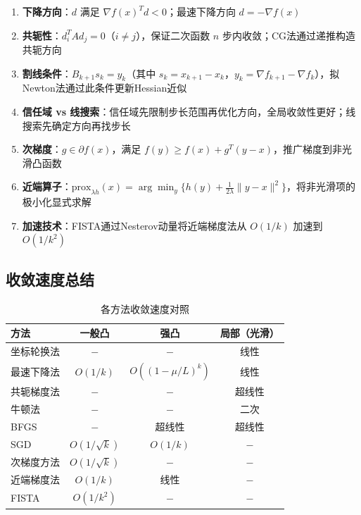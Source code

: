 \begin{enumerate}[label=\arabic*., leftmargin=2em]
    \item \textbf{下降方向}：$d$ 满足 $\nabla f(x)^T d < 0$；最速下降方向 $d = -\nabla f(x)$
    
    \item \textbf{共轭性}：$d_i^T A d_j = 0$（$i \neq j$），保证二次函数 $n$ 步内收敛；CG法通过递推构造共轭方向
    
    \item \textbf{割线条件}：$B_{k+1} s_k = y_k$（其中 $s_k = x_{k+1}-x_k$，$y_k = \nabla f_{k+1}-\nabla f_k$），拟Newton法通过此条件更新Hessian近似
    
    \item \textbf{信任域 vs 线搜索}：信任域先限制步长范围再优化方向，全局收敛性更好；线搜索先确定方向再找步长
    
    \item \textbf{次梯度}：$g \in \partial f(x)$，满足 $f(y) \geq f(x) + g^T(y-x)$，推广梯度到非光滑凸函数
    
    \item \textbf{近端算子}：$\text{prox}_{\lambda h}(x) = \arg\min_y \{h(y) + \frac{1}{2\lambda}\|y-x\|^2\}$，将非光滑项的极小化显式求解
    
    \item \textbf{加速技术}：FISTA通过Nesterov动量将近端梯度法从 $O(1/k)$ 加速到 $O(1/k^2)$
\end{enumerate}

\subsection{收敛速度总结}

\begin{table}[H]
\centering
\caption{各方法收敛速度对照}
\begin{tabular}{@{}lccc@{}}
\toprule
\textbf{方法} & \textbf{一般凸} & \textbf{强凸} & \textbf{局部（光滑）} \\
\midrule
坐标轮换法 & $-$ & $-$ & 线性 \\
最速下降法 & $O(1/k)$ & $O((1-\mu/L)^k)$ & 线性 \\
共轭梯度法 & $-$ & $-$ & 超线性 \\
牛顿法 & $-$ & $-$ & 二次 \\
BFGS & $-$ & 超线性 & 超线性 \\
SGD & $O(1/\sqrt{k})$ & $O(1/k)$ & $-$ \\
次梯度方法 & $O(1/\sqrt{k})$ & $-$ & $-$ \\
近端梯度法 & $O(1/k)$ & 线性 & $-$ \\
FISTA & $O(1/k^2)$ & $-$ & $-$ \\
\bottomrule
\end{tabular}
\end{table}

